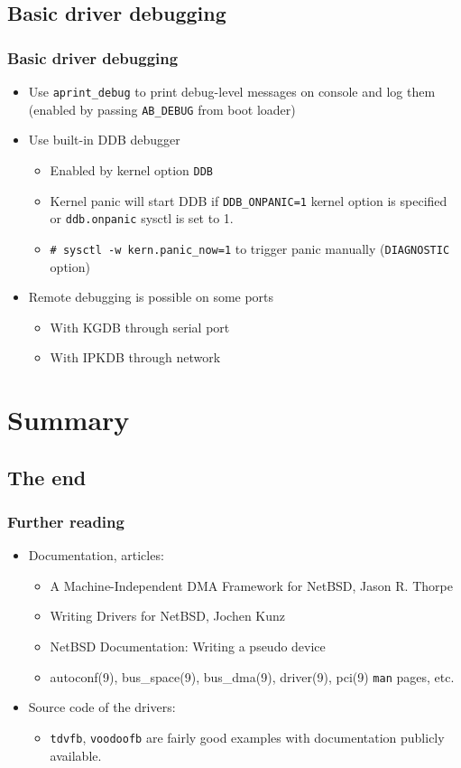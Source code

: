 \documentclass[dvipsnames,table]{beamer}
\begin{document}
\subsection{Basic driver debugging}

\begin{frame}
\frametitle{Basic driver debugging} 
\begin{itemize}
	\item Use {\tt aprint\_debug} to print debug-level messages on console and log them (enabled by passing {\tt AB\_DEBUG} from boot loader)
	\item Use built-in DDB debugger
	\begin{itemize}
			\item Enabled by kernel option {\tt DDB}
			\item Kernel panic will start DDB if {\tt DDB\_ONPANIC=1} kernel option is specified or {\tt ddb.onpanic} sysctl is set to 1.
			\item {\tt \# sysctl -w kern.panic\_now=1} to trigger panic manually ({\tt DIAGNOSTIC} option)
	\end{itemize}	
	\item Remote debugging is possible on some ports
	\begin{itemize}
			\item With KGDB through serial port
			\item With IPKDB through network
	\end{itemize}	
\end{itemize}
\end{frame}

\section{Summary}
\subsection{The end}

\begin{frame}
\frametitle{Further reading}
\begin{itemize}
	\item Documentation, articles:
	\begin{itemize}
		\item A Machine-Independent DMA Framework for NetBSD, Jason R. Thorpe
		\item Writing Drivers for NetBSD, Jochen Kunz
		\item NetBSD Documentation: Writing a pseudo device
		\item autoconf(9), bus\_space(9), bus\_dma(9), driver(9), pci(9) {\tt man} pages, etc.
	\end{itemize}
	\item Source code of the drivers:
	\begin{itemize}
		\item {\tt tdvfb}, {\tt voodoofb} are fairly good examples with documentation publicly available.
	\end{itemize}
\end{itemize}

\end{frame}
\end{document}
